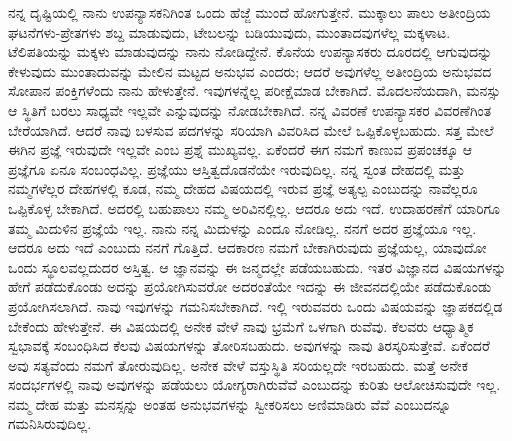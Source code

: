 ನನ್ನ ದೃಷ್ಟಿಯಲ್ಲಿ ನಾನು ಉಪನ್ಯಾಸಕನಿಗಿಂತ ಒಂದು ಹೆಜ್ಜೆ ಮುಂದೆ ಹೋಗುತ್ತೇನೆ. ಮುಕ್ಕಾಲು ಪಾಲು ಅತೀಂದ್ರಿಯ ಘಟನೆಗಳು-ಪ್ರೇತಗಳು ಶಬ್ದ ಮಾಡುವುದು, ಟೇಬಲನ್ನು ಬಡಿಯುವುದು, ಮುಂತಾದವುಗಳೆಲ್ಲ ಮಕ್ಕಳಾಟ. ಟೆಲಿಪತಿಯನ್ನು ಮಕ್ಕಳು ಮಾಡುವುದನ್ನು ನಾನು ನೋಡಿದ್ದೇನೆ. ಕೊನೆಯ ಉಪನ್ಯಾಸಕರು ದೂರದಲ್ಲಿ ಆಗುವುದನ್ನು ಕೇಳುವುದು ಮುಂತಾದುವನ್ನು ಮೇಲಿನ ಮಟ್ಟದ ಅನುಭವ ಎಂದರು; ಆದರೆ ಅವುಗಳೆಲ್ಲ ಅತೀಂದ್ರಿಯ ಅನುಭವದ ಸೋಪಾನ ಪಂಕ್ತಿಗಳೆಂದು ನಾನು ಹೇಳುತ್ತೇನೆ. ಇವುಗಳನ್ನೆಲ್ಲ ಪರೀಕ್ಷೆಮಾಡ ಬೇಕಾಗಿದೆ. ಮೊದಲನೆಯದಾಗಿ, ಮನಸ್ಸು ಆ ಸ್ಥಿತಿಗೆ ಬರಲು ಸಾಧ್ಯವೇ ಇಲ್ಲವೇ ಎನ್ನುವುದನ್ನು ನೋಡಬೇಕಾಗಿದೆ. ನನ್ನ ವಿವರಣೆ ಉಪನ್ಯಾಸಕರ ವಿವರಣೆಗಿಂತ ಬೇರೆಯಾಗಿದೆ. ಆದರೆ ನಾವು ಬಳಸುವ ಪದಗಳನ್ನು ಸರಿಯಾಗಿ ವಿವರಿಸಿದ ಮೇಲೆ ಒಪ್ಪಿಕೊಳ್ಳಬಹುದು. ಸತ್ತ ಮೇಲೆ ಈಗಿನ ಪ್ರಜ್ಞೆ ಇರುವುದೇ ಇಲ್ಲವೇ ಎಂಬ ಪ್ರಶ್ನೆ ಮುಖ್ಯವಲ್ಲ. ಏಕೆಂದರೆ ಈಗ ನಮಗೆ ಕಾಣುವ ಪ್ರಪಂಚಕ್ಕೂ ಆ ಪ್ರಜ್ಞೆಗೂ ಏನೂ ಸಂಬಂಧವಿಲ್ಲ. ಪ್ರಜ್ಞೆಯು ಆಸ್ತಿತ್ವದೊಡನೆಯೇ ಇರುವುದಿಲ್ಲ. ನನ್ನ ಸ್ವಂತ ದೇಹದಲ್ಲಿ ಮತ್ತು ನಮ್ಮಗಳೆಲ್ಲರ ದೇಹಗಳಲ್ಲಿ ಕೂಡ, ನಮ್ಮ ದೇಹದ ವಿಷಯದಲ್ಲಿ ಇರುವ ಪ್ರಜ್ಞೆ ಅತ್ಯಲ್ಪ ಎಂಬುದನ್ನು ನಾವೆಲ್ಲರೂ ಒಪ್ಪಿಕೊಳ್ಳ ಬೇಕಾಗಿದೆ. ಅದರಲ್ಲಿ ಬಹುಪಾಲು ನಮ್ಮ ಅರಿವಿನಲ್ಲಿಲ್ಲ. ಆದರೂ ಅದು ಇದೆ. ಉದಾಹರಣೆಗೆ ಯಾರಿಗೂ ತಮ್ಮ ಮಿದುಳಿನ ಪ್ರಜ್ಞೆಯೆ ಇಲ್ಲ. ನಾನು ನನ್ನ ಮಿದುಳನ್ನು ಎಂದೂ ನೋಡಿಲ್ಲ. ನನಗೆ ಅದರ ಪ್ರಜ್ಞೆಯೂ ಇಲ್ಲ. ಆದರೂ ಅದು ಇದೆ ಎಂಬುದು ನನಗೆ ಗೊತ್ತಿದೆ. ಆದಕಾರಣ ನಮಗೆ ಬೇಕಾಗಿರುವುದು ಪ್ರಜ್ಞೆಯಲ್ಲ, ಯಾವುದೋ ಒಂದು ಸ್ಥೂಲವಲ್ಲದುದರ ಅಸ್ತಿತ್ವ. ಆ ಜ್ಞಾನವನ್ನು ಈ ಜನ್ಮದಲ್ಲೇ ಪಡೆಯಬಹುದು. ಇತರ ವಿಜ್ಞಾನದ ವಿಷಯಗಳನ್ನು ಹೇಗೆ ಪಡೆದುಕೊಂಡು ಅದನ್ನು ಪ್ರಯೋಗಿಸುವರೋ ಅದರಂತೆಯೇ ಇದನ್ನು ಈ ಜೀವನದಲ್ಲಿಯೇ ಪಡೆದುಕೊಂಡು ಪ್ರಯೋಗಿಸಲಾಗಿದೆ. ನಾವು ಇವುಗಳನ್ನು ಗಮನಿಸಬೇಕಾಗಿದೆ. ಇಲ್ಲಿ ಇರುವವರು ಒಂದು ವಿಷಯವನ್ನು ಜ್ಞಾಪಕದಲ್ಲಿಡ ಬೇಕೆಂದು ಹೇಳುತ್ತೇನೆ. ಈ ವಿಷಯದಲ್ಲಿ ಅನೇಕ ವೇಳೆ ನಾವು ಭ್ರಮೆಗೆ ಒಳಗಾಗಿ ರುವೆವು. ಕೆಲವರು ಆಧ್ಯಾತ್ಮಿಕ ಸ್ವಭಾವಕ್ಕೆ ಸಂಬಂಧಿಸಿದ ಕೆಲವು ವಿಷಯಗಳನ್ನು ತೋರಿಸಬಹುದು. ಅವುಗಳನ್ನು ನಾವು ತಿರಸ್ಕರಿಸುತ್ತೇವೆ. ಏಕೆಂದರೆ ಅವು ಸತ್ಯವೆಂದು ನಮಗೆ ತೋರುವುದಿಲ್ಲ. ಅನೇಕ ವೇಳೆ ವಸ್ತುಸ್ಥಿತಿ ಸರಿಯಲ್ಲದೇ ಇರಬಹುದು. ಮತ್ತೆ ಅನೇಕ ಸಂದರ್ಭಗಳಲ್ಲಿ ನಾವು ಅವುಗಳನ್ನು ಪಡೆಯಲು ಯೋಗ್ಯರಾಗಿರುವೆವೆ ಎಂಬುದನ್ನು ಕುರಿತು ಆಲೋಚಿಸುವುದೇ ಇಲ್ಲ. ನಮ್ಮ ದೇಹ ಮತ್ತು ಮನಸ್ಸನ್ನು ಅಂತಹ ಅನುಭವಗಳನ್ನು ಸ್ವೀಕರಿಸಲು ಅಣಿಮಾಡಿರು ವೆವೆ ಎಂಬುದನ್ನೂ ಗಮನಿಸಿರುವುದಿಲ್ಲ.

